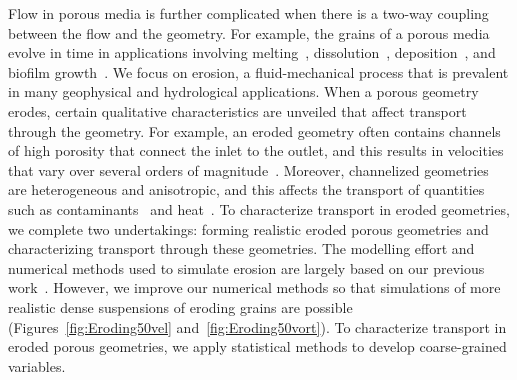 \documentclass[preprint,10pt]{elsarticle}
\begin{document}
Flow in porous media is further complicated when there is a two-way
coupling between the flow and the geometry. For example, the grains of a
porous media evolve in time in applications involving
melting~\cite{bec-vis1998}, dissolution~\cite{kan-zha-che-he2002},
deposition~\cite{joh-eli1995}, and biofilm
growth~\cite{tan-val-wer2015}.  We focus on erosion, a fluid-mechanical
process that is prevalent in many geophysical and hydrological
applications.  When a porous geometry erodes, certain qualitative
characteristics are unveiled that affect transport through the geometry.
For example, an eroded geometry often contains channels of high porosity
that connect the inlet to the outlet, and this results in velocities
that vary over several orders of magnitude~\cite{all-hea-lab-rei2002}.
Moreover, channelized geometries are heterogeneous and anisotropic, and
this affects the transport of quantities such as
contaminants~\cite{cve-che-wen1996, dag1987, kon-bre1978} and
heat~\cite{nil-sto1990, ree-sto1995}.  To characterize transport in
eroded geometries, we complete two undertakings: forming realistic
eroded porous geometries and characterizing transport through these
geometries.  The modelling effort and numerical methods used to simulate
erosion are largely based on our previous work~\cite{qua-moo2018}.
However, we improve our numerical methods so that simulations of more
realistic dense suspensions of eroding grains are possible
(Figures~\ref{fig:Eroding50vel} and~\ref{fig:Eroding50vort}).  To
characterize transport in eroded porous geometries, we apply statistical
methods to develop coarse-grained variables.
\end{document}
